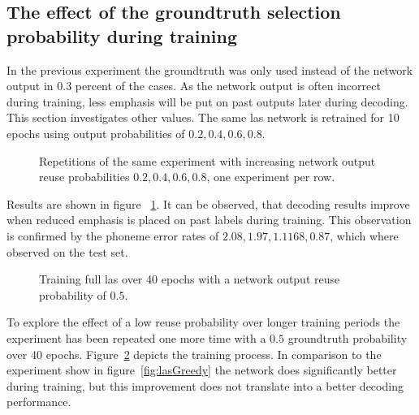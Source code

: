 \subsection{The effect of the groundtruth selection probability during training}
In the previous experiment the groundtruth was only used instead of the network output in 0.3 percent of the cases. As the network output is often incorrect during training, less emphasis will be put on past outputs later during decoding. This section investigates
other values. The same las network is retrained for 10 epochs using output probabilities of $0.2,0.4,0.6,0.8$.
\begin{figure}
\centering








\caption{Repetitions of the same experiment with increasing network output reuse probabilities $0.2, 0.4, 0.6, 0.8$, one experiment per row.}
\label{fig:lasGreedy2468}
\end{figure}
Results are shown in figure ~\ref{fig:lasGreedy2468}. It can be observed, that decoding results improve when reduced emphasis is placed on past labels during training. This observation is confirmed by the phoneme error rates of $2.08, 1.97, 1.1168, 0.87$, which where observed on the test set.
\begin{figure}[h]


\caption{Training full las over 40 epochs with a network output reuse probability of $0.5$.}
\label{fig:lasGreedy05}
\end{figure}
To explore the effect of a low reuse probability over longer training periods the experiment has been repeated one more time with a $0.5$ groundtruth probability over 40 epochs.
Figure~\ref{fig:lasGreedy05} depicts the training process. In comparison to the experiment show in figure~\ref{fig:lasGreedy} the network does significantly better during training, but
this improvement does not translate into a better decoding performance.

